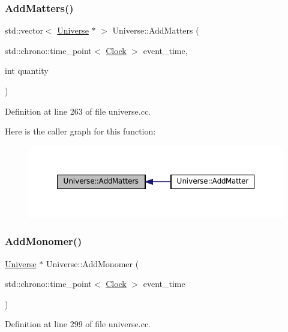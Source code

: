 \subsubsection{\texorpdfstring{Add\+Matters()}{AddMatters()}}
{\footnotesize\ttfamily std\+::vector$<$ \mbox{\hyperlink{class_universe}{Universe}} $\ast$ $>$ Universe\+::\+Add\+Matters (\begin{DoxyParamCaption}\item[{std\+::chrono\+::time\+\_\+point$<$ \mbox{\hyperlink{universe_8h_a0ef8d951d1ca5ab3cfaf7ab4c7a6fd80}{Clock}} $>$}]{event\+\_\+time,  }\item[{int}]{quantity }\end{DoxyParamCaption})}



Definition at line 263 of file universe.\+cc.

Here is the caller graph for this function\+:\nopagebreak
\begin{figure}[H]
\begin{center}
\leavevmode
\includegraphics[width=350pt]{class_universe_ae00d10b2a23c9cedf1ff89e9da875563_icgraph}
\end{center}
\end{figure}
\mbox{\label{class_universe_a062a9472f0400e566ecc7dc056d989d9}} 
\subsubsection{\texorpdfstring{Add\+Monomer()}{AddMonomer()}}
{\footnotesize\ttfamily \mbox{\hyperlink{class_universe}{Universe}} $\ast$ Universe\+::\+Add\+Monomer (\begin{DoxyParamCaption}\item[{std\+::chrono\+::time\+\_\+point$<$ \mbox{\hyperlink{universe_8h_a0ef8d951d1ca5ab3cfaf7ab4c7a6fd80}{Clock}} $>$}]{event\+\_\+time }\end{DoxyParamCaption})}



Definition at line 299 of file universe.\+cc.

